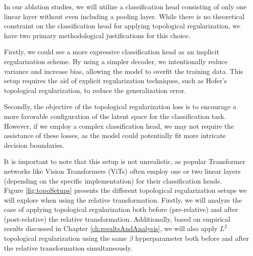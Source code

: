 \documentclass[../main.tex]{subfiles}
\begin{document}
In our ablation studies, we will utilize a classification head consisting of only one linear layer without even including a pooling layer. While there is no theoretical constraint on the classification head for applying topological regularization, we have two primary methodological justifications for this choice.

Firstly, we could see a more expressive classification head as an implicit regularization scheme. By using a simpler decoder, we intentionally reduce variance and increase bias, allowing the model to overfit the training data. This setup requires the aid of explicit regularization techniques, such as Hofer's topological regularization, to reduce the generalization error.

Secondly, the objective of the topological regularization loss is to encourage a more favorable configuration of the latent space for the classification task. However, if we employ a complex classification head, we may not require the assistance of these losses, as the model could potentially fit more intricate decision boundaries.

It is important to note that this setup is not unrealistic, as popular Transformer networks like Vision Transformers (ViTs) \cite{dosovitskiy_vit_2021} often employ one or two linear layers (depending on the specific implementation) for their classification heads.\\


Figure \ref{fig:topoSetups} presents the different topological regularization setups we will explore when using the relative transformation. Firstly, we will analyze the case of applying topological regularization both before (pre-relative) and after (post-relative) the relative transformation. Additionally, based on empirical results discussed in Chapter \ref{ch:resultsAndAnalysis}, we will also apply $L^2$ topological regularization using the same $\beta$ hyperparameter both before and after the relative transformation simultaneously.
\end{document}
